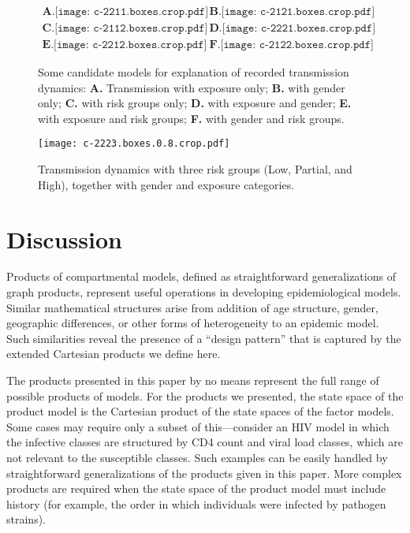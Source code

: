 \documentclass[review]{elsarticle}
\begin{document}
\begin{figure}
\[
\begin{array}{ll}
\textbf{A.}
\texttt{[image: c-2211.boxes.crop.pdf]}

&
\textbf{B.}
\texttt{[image: c-2121.boxes.crop.pdf]}

\\
\textbf{C.}
\texttt{[image: c-2112.boxes.crop.pdf]}

&
\textbf{D.}
\texttt{[image: c-2221.boxes.crop.pdf]}

\\
\textbf{E.}
\texttt{[image: c-2212.boxes.crop.pdf]}

&
\textbf{F.}
\texttt{[image: c-2122.boxes.crop.pdf]}

\end{array}
\]
\caption{\label{fig:gonorrhea-marginals}
Some candidate models for explanation of recorded transmission
dynamics:
\textbf{A.} Transmission with exposure only;
\textbf{B.} with gender only;
\textbf{C.} with risk groups only;
\textbf{D.} with exposure and gender;
\textbf{E.} with exposure and risk groups;
\textbf{F.} with gender and risk groups.
}
\end{figure}

\begin{figure}
\centering
\texttt{[image: c-2223.boxes.0.8.crop.pdf]}

\caption{\label{fig:gonorrhea-2223}
Transmission dynamics with three risk groups (Low, Partial, and High),
together with gender and exposure categories.}
\end{figure}

\section{Discussion}
Products of compartmental models, defined as straightforward
generalizations of graph products, represent useful operations in
developing epidemiological models.  Similar mathematical
structures arise from addition of 
age structure, gender, geographic differences, or other
forms of heterogeneity to an epidemic model.  Such
similarities reveal the presence of a ``design pattern''
\cite{alexander1977pattern}
that is captured by the extended Cartesian products we define here.

The products presented in this paper by no means represent
the full range of possible products of models.  For
the products we presented,
the state space of the product model is the Cartesian product
of the state spaces of the factor models.  Some cases may
require only a subset of this---consider an HIV model in which
the infective classes are structured by CD4 count and viral load
classes, which are not relevant to the susceptible classes.  
Such examples can be easily handled by straightforward generalizations
of the products given in this paper.  More complex products
are required when the state space of the product model must
include history (for example, the order in which individuals
were infected by pathogen strains).  
\end{document}
